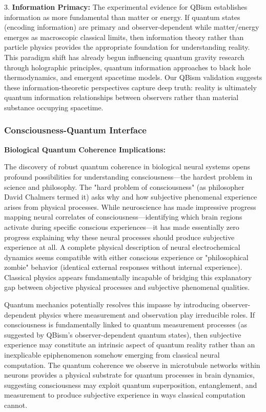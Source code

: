 \documentclass[11pt,a4paper,twoside]{article}
\begin{document}
3. \textbf{Information Primacy:} The experimental evidence for QBism establishes information as more fundamental than matter or energy. If quantum states (encoding information) are primary and observer-dependent while matter/energy emerges as macroscopic classical limits, then information theory rather than particle physics provides the appropriate foundation for understanding reality. This paradigm shift has already begun influencing quantum gravity research through holographic principles, quantum information approaches to black hole thermodynamics, and emergent spacetime models. Our QBism validation suggests these information-theoretic perspectives capture deep truth: reality is ultimately quantum information relationships between observers rather than material substance occupying spacetime.

\subsubsection{Consciousness-Quantum Interface}

\textbf{Biological Quantum Coherence Implications:}

The discovery of robust quantum coherence in biological neural systems opens profound possibilities for understanding consciousness---the hardest problem in science and philosophy. The "hard problem of consciousness" (as philosopher David Chalmers termed it) asks why and how subjective phenomenal experience arises from physical processes. While neuroscience has made impressive progress mapping neural correlates of consciousness---identifying which brain regions activate during specific conscious experiences---it has made essentially zero progress explaining why these neural processes should produce subjective experience at all. A complete physical description of neural electrochemical dynamics seems compatible with either conscious experience or "philosophical zombie" behavior (identical external responses without internal experience). Classical physics appears fundamentally incapable of bridging this explanatory gap between objective physical processes and subjective phenomenal qualities.

Quantum mechanics potentially resolves this impasse by introducing observer-dependent physics where measurement and observation play irreducible roles. If consciousness is fundamentally linked to quantum measurement processes (as suggested by QBism's observer-dependent quantum states), then subjective experience may constitute an intrinsic aspect of quantum reality rather than an inexplicable epiphenomenon somehow emerging from classical neural computation. The quantum coherence we observe in microtubule networks within neurons provides a physical substrate for quantum processes in brain dynamics, suggesting consciousness may exploit quantum superposition, entanglement, and measurement to produce subjective experience in ways classical computation cannot.
\end{document}
